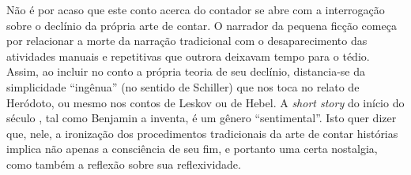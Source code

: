 Não é por acaso que este conto acerca do contador se abre com a
interrogação sobre o declínio da própria arte de contar. O narrador da
pequena ficção começa por relacionar a morte da narração tradicional com
o desaparecimento das atividades manuais e repetitivas que outrora
deixavam tempo para o tédio. Assim, ao incluir no conto a própria teoria
de seu declínio, distancia-se da simplicidade ``ingênua'' (no sentido de
Schiller) que nos toca no relato de Heródoto, ou mesmo nos contos de
Leskov ou de Hebel. A \emph{short story} do início do século , tal
como Benjamin a inventa, é um gênero ``sentimental''. Isto quer dizer
que, nele, a ironização dos procedimentos tradicionais da arte de contar
histórias implica não apenas a consciência de seu fim, e portanto uma
certa nostalgia, como também a reflexão sobre sua reflexividade.
